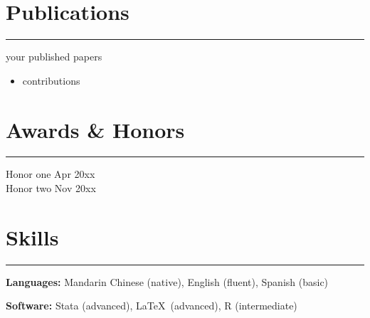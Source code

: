 \documentclass[a4paper,10pt]{article}
\begin{document}
	
	\section*{Publications}
	\hrule
	\vspace{0.2cm}
	your published papers
	\begin{itemize}
		\item contributions
	\end{itemize}
	
	
	\section*{Awards \& Honors}
	\hrule
	\vspace{0.2cm}
	Honor one \hfill Apr 20xx\\
	Honor two \hfill Nov 20xx\\
	
	
	\section*{Skills}
	\hrule
	\vspace{0.2cm}
	\textbf{Languages:} Mandarin Chinese (native), English (fluent), Spanish (basic)
	\vspace{1em}
	\par\noindent
	\textbf{Software:} Stata (advanced), \LaTeX\ (advanced), R (intermediate)\\
	
\end{document}
